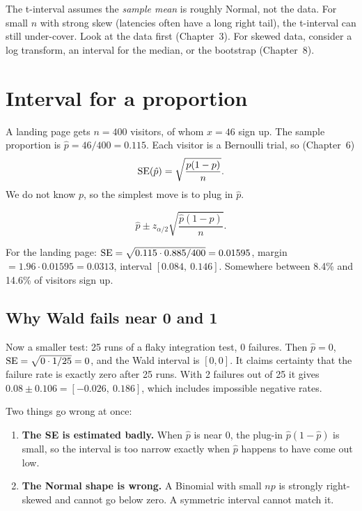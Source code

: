\begin{trapbox}
The t-interval assumes the \emph{sample mean} is roughly Normal, not the data.
For small $n$ with strong skew (latencies often have a long right tail), the
t-interval can still under-cover. Look at the data first (Chapter~3). For
skewed data, consider a log transform, an interval for the median, or the
bootstrap (Chapter~8).
\end{trapbox}

\section{Interval for a proportion}
\label{sec:ci-proportion}

A landing page gets $n=400$ visitors, of whom $x=46$ sign up. The sample
proportion is $\hat p = 46/400 = 0.115$. Each visitor is a Bernoulli trial, so
(Chapter~6)
\[
  \operatorname{SE}(\hat p) = \sqrt{\frac{p(1-p)}{n}}.
\]
We do not know $p$, so the simplest move is to plug in $\hat p$.

\begin{definition}
\[
  \hat p \pm z_{\alpha/2}\sqrt{\frac{\hat p(1-\hat p)}{n}}.
\]
\end{definition}

For the landing page: $\operatorname{SE} = \sqrt{0.115\cdot 0.885/400} = 0.01595$, margin
$= 1.96\cdot 0.01595 = 0.0313$, interval $[0.084,\ 0.146]$. Somewhere between
8.4\% and 14.6\% of visitors sign up.

\subsection{Why Wald fails near 0 and 1}

Now a smaller test: 25 runs of a flaky integration test, 0 failures. Then
$\hat p = 0$, $\operatorname{SE} = \sqrt{0\cdot 1/25} = 0$, and the Wald interval is
$[0,0]$. It claims certainty that the failure rate is exactly zero after 25
runs. With 2 failures out of 25 it gives $0.08 \pm 0.106 = [-0.026,\ 0.186]$,
which includes impossible negative rates.

Two things go wrong at once:
\begin{enumerate}
  \item \textbf{The SE is estimated badly.} When $\hat p$ is near 0, the plug-in
        $\hat p(1-\hat p)$ is small, so the interval is too narrow exactly when
        $\hat p$ happens to have come out low.
  \item \textbf{The Normal shape is wrong.} A Binomial with small $np$ is
        strongly right-skewed and cannot go below zero. A symmetric interval
        cannot match it.
\end{enumerate}

